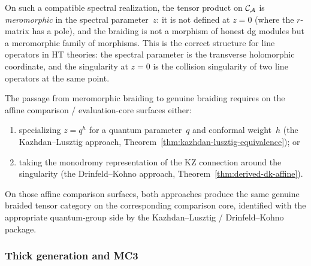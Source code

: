 \begin{remark}
\label{rem:thqg-V-meromorphic-braiding}
On such a compatible spectral realization, the tensor product on
$\mathcal{C}_{\mathcal{A}}$ is \emph{meromorphic} in the spectral
parameter~$z$: it is not defined at $z = 0$ (where the $r$-matrix
has a pole), and the braiding is not a morphism of honest dg modules
but a meromorphic family of morphisms. This is the correct structure
for line operators in HT theories: the spectral parameter is the
transverse holomorphic coordinate, and the singularity at $z = 0$ is
the collision singularity of two line operators at the same point.

The passage from meromorphic braiding to genuine braiding requires
on the affine comparison / evaluation-core surfaces either:
\begin{enumerate}[label=\textup{(\roman*)}]
\item specializing $z = q^h$ for a quantum parameter~$q$ and
 conformal weight~$h$ (the Kazhdan--Lusztig approach,
 Theorem~\ref{thm:kazhdan-lusztig-equivalence}); or
\item taking the monodromy representation of the KZ connection
 around the singularity (the Drinfeld--Kohno approach,
 Theorem~\ref{thm:derived-dk-affine}).
\end{enumerate}
On those affine comparison surfaces, both approaches produce the same
genuine braided tensor category on the corresponding comparison core,
identified with the appropriate quantum-group side by the
Kazhdan--Lusztig / Drinfeld--Kohno package.
\end{remark}


\subsubsection{Thick generation and MC3}

